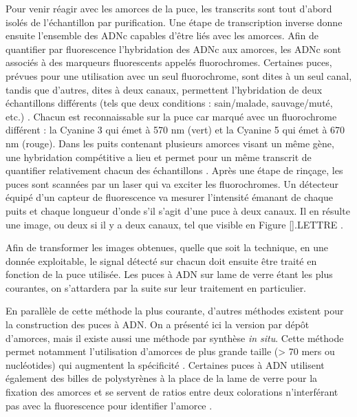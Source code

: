 Pour venir réagir avec les amorces de la puce, les transcrits sont tout d'abord isolés de l'échantillon par purification. Une étape de transcription inverse donne ensuite l'ensemble des ADNc capables d'être liés avec les amorces. Afin de quantifier par fluorescence l'hybridation des ADNc aux amorces, les ADNc sont associés à des marqueurs fluorescents appelés fluorochromes. Certaines puces, prévues pour une utilisation avec un seul fluorochrome, sont dites à un seul canal, tandis que d'autres, dites à deux canaux, permettent l'hybridation de deux échantillons différents (tels que deux conditions : sain/malade, sauvage/muté, etc.) \cite{Bumgarner2013Jan}. Chacun est reconnaissable sur la puce car marqué avec un fluorochrome différent : la Cyanine 3 qui émet à  570 nm (vert) et la Cyanine 5 qui émet à 670 nm (rouge). Dans les puits contenant plusieurs amorces visant un même gène, une hybridation compétitive a lieu et permet pour un même transcrit de quantifier relativement chacun des échantillons \cite{Koltai2008Apr}. Après une étape de rinçage, les puces sont scannées par un laser qui va exciter les fluorochromes. Un détecteur équipé d'un capteur de fluorescence va mesurer l'intensité émanant de chaque puits et chaque longueur d'onde s'il s'agit d'une puce à deux canaux. Il en résulte une image, ou deux si il y a deux canaux, tel que visible en Figure \ref{}.LETTRE .



Afin de transformer les images obtenues, quelle que soit la technique, en une donnée exploitable, le signal détecté sur chacun doit ensuite être traité en fonction de la puce utilisée. Les puces à ADN sur lame de verre étant les plus courantes, on s'attardera par la suite sur leur traitement en particulier.

En parallèle de cette méthode la plus courante, d'autres méthodes existent pour la construction des puces à ADN. On a présenté ici la version par dépôt d'amorces, mais il existe aussi une méthode par synthèse \textit{in situ}. Cette méthode permet notamment l'utilisation d'amorces de plus grande taille (> 70 mers ou nucléotides) qui augmentent la spécificité \cite{Liu2010}. Certaines puces à ADN utilisent également des billes de polystyrènes à la place de la lame de verre pour la fixation des amorces et se servent de ratios entre deux colorations n'interférant pas avec la fluorescence pour identifier l'amorce \cite{Nesterov-Mueller2014Oct}. 

